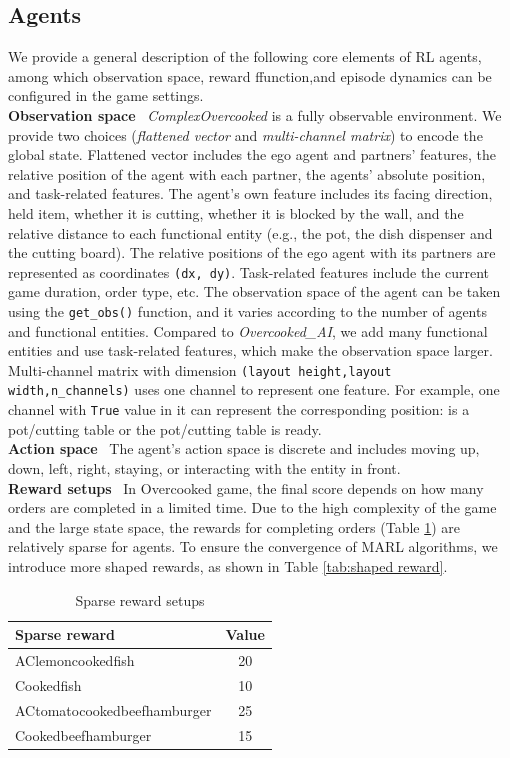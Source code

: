 \subsection{Agents}
We provide a general description of the following core elements of RL agents, among which observation space, reward ffunction,and episode dynamics can be configured in the game settings. \\
\textbf{Observation space} \  \textit{ComplexOvercooked} is a fully observable environment. We provide two choices (\textit{flattened vector} and \textit{multi-channel matrix}) to encode the global state. Flattened vector includes the ego agent and partners' features, the relative position of the agent with each partner, the agents' absolute position, and task-related features. The agent's own feature includes its facing direction, held item, whether it is cutting, whether it is blocked by the wall, and the relative distance to each functional entity (e.g., the pot, the dish dispenser and the cutting board). The relative positions of the ego agent with its partners are represented as coordinates \texttt{(dx, dy)}. Task-related features include the current game duration, order type, etc. The observation space of the agent can be taken using the \texttt{get\_obs()} function, and it varies according to the number of agents and functional entities. Compared to \textit{Overcooked\_AI}, we add many functional entities and use task-related features, which make the observation space larger. Multi-channel matrix with dimension \texttt{(layout height,layout width,n\_channels)} uses one channel to represent one feature. For example, one channel with \texttt{True} value in it can represent the corresponding position: is a pot/cutting table or the pot/cutting table is ready.   \\
\textbf{Action space} \ The agent's action space is discrete and includes moving up, down, left, right, staying, or interacting with the entity in front.\\
\textbf{Reward setups} \ In Overcooked game, the final score depends on how many orders are completed in a limited time. Due to the high complexity of the game and the large state space, the rewards for completing orders (Table \ref{tab:sparse reward}) are relatively sparse for agents. To ensure the convergence of MARL algorithms, we introduce more shaped rewards, as shown in Table \ref{tab:shaped reward}.

\begin{table}[htb]
\centering
\caption{Sparse reward setups}
\label{tab:sparse reward}
\setlength{\tabcolsep}{3.5mm}
\begin{tabular}{lc}
\toprule
\textbf{Sparse reward} & \textbf{Value} \\
\midrule
AClemoncookedfish  & 20         \\
Cookedfish    & 10    \\
ACtomatocookedbeefhamburger  & 25  \\
Cookedbeefhamburger        & 15     \\
\bottomrule
\end{tabular}
\end{table}

